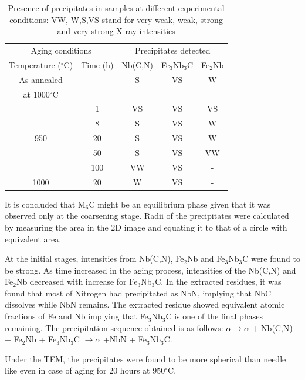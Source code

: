 \documentclass[12pt]{article}
\begin{document}
\begin{table}
\centering
\hspace*{-5em}
\caption{Presence of precipitates in samples at different experimental conditions: VW, W,S,VS stand for very weak, weak, strong and very strong X-ray intensities}
\hspace*{-5em}
\begin{tabular}{ c c c c c }
\hline
\multicolumn{2}{c}{Aging conditions} &  \multicolumn{3}{c}{Precipitates detected}\\
Temperature ($^\circ$C) & Time (h) & Nb(C,N) & Fe$_3$Nb$_3$C & Fe$_2$Nb \\ \hline
As annealed &  & S & VS & W \\
at 1000$^\circ$C & & & & \\ 
 & 1 & VS & VS & VS \\
 & 8 & S & VS & W \\
950 & 20 & S & VS & W \\
 & 50 & S & VS & VW \\
 & 100 & VW & VS & - \\
1000 & 20 & W & VS & - \\ \hline
\end{tabular}
\label{tab:prec}
\end{table}
It is concluded that M$_6$C might be an equilibrium phase given that it was observed only at the coarsening stage. Radii of the precipitates were calculated by measuring the area in the 2D image and equating it to that of a circle with equivalent area.

 At the initial stages, intensities from Nb(C,N), Fe$_2$Nb and Fe$_3$Nb$_3$C were found to be strong. As time increased in the aging process, intensities of the Nb(C,N) and Fe$_2$Nb decreased with increase for Fe$_3$Nb$_3$C. In the extracted residues, it was found that most of Nitrogen had precipitated as NbN, implying that NbC dissolves while NbN remains. The extracted residue showed equivalent atomic fractions of Fe and Nb implying that Fe$_3$Nb$_3$C is one of the final phases remaining. The precipitation sequence obtained is as follows:
\newline
$\alpha \rightarrow \alpha$ + Nb(C,N) + Fe$_2$Nb + Fe$_3$Nb$_3$C $\rightarrow \alpha$ +NbN + Fe$_3$Nb$_3$C.


Under the TEM, the precipitates were found to be more spherical than needle like even in case of aging for 20 hours at 950$^\circ$C.
\end{document}
